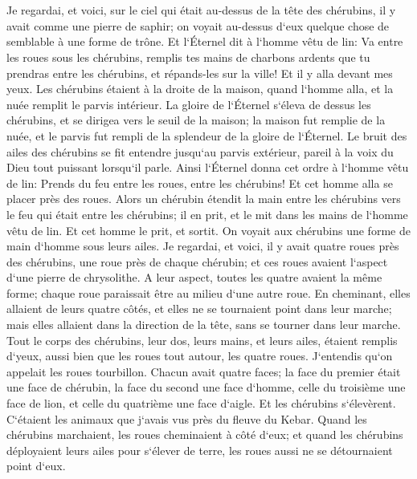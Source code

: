 \chapter{}

\verse Je regardai, et voici, sur le ciel qui était au-dessus de la tête des chérubins, il y avait comme une pierre de saphir; on voyait au-dessus d`eux quelque chose de semblable à une forme de trône. 
\verse Et l`Éternel dit à l`homme vêtu de lin: Va entre les roues sous les chérubins, remplis tes mains de charbons ardents que tu prendras entre les chérubins, et répands-les sur la ville! Et il y alla devant mes yeux. 
\verse Les chérubins étaient à la droite de la maison, quand l`homme alla, et la nuée remplit le parvis intérieur. 
\verse La gloire de l`Éternel s`éleva de dessus les chérubins, et se dirigea vers le seuil de la maison; la maison fut remplie de la nuée, et le parvis fut rempli de la splendeur de la gloire de l`Éternel. 
\verse Le bruit des ailes des chérubins se fit entendre jusqu`au parvis extérieur, pareil à la voix du Dieu tout puissant lorsqu`il parle. 
\verse Ainsi l`Éternel donna cet ordre à l`homme vêtu de lin: Prends du feu entre les roues, entre les chérubins! Et cet homme alla se placer près des roues. 
\verse Alors un chérubin étendit la main entre les chérubins vers le feu qui était entre les chérubins; il en prit, et le mit dans les mains de l`homme vêtu de lin. Et cet homme le prit, et sortit. 
\verse On voyait aux chérubins une forme de main d`homme sous leurs ailes. 
\verse Je regardai, et voici, il y avait quatre roues près des chérubins, une roue près de chaque chérubin; et ces roues avaient l`aspect d`une pierre de chrysolithe. 
\verse A leur aspect, toutes les quatre avaient la même forme; chaque roue paraissait être au milieu d`une autre roue. 
\verse En cheminant, elles allaient de leurs quatre côtés, et elles ne se tournaient point dans leur marche; mais elles allaient dans la direction de la tête, sans se tourner dans leur marche. 
\verse Tout le corps des chérubins, leur dos, leurs mains, et leurs ailes, étaient remplis d`yeux, aussi bien que les roues tout autour, les quatre roues. 
\verse J`entendis qu`on appelait les roues tourbillon. 
\verse Chacun avait quatre faces; la face du premier était une face de chérubin, la face du second une face d`homme, celle du troisième une face de lion, et celle du quatrième une face d`aigle. 
\verse Et les chérubins s`élevèrent. C`étaient les animaux que j`avais vus près du fleuve du Kebar. 
\verse Quand les chérubins marchaient, les roues cheminaient à côté d`eux; et quand les chérubins déployaient leurs ailes pour s`élever de terre, les roues aussi ne se détournaient point d`eux. 
